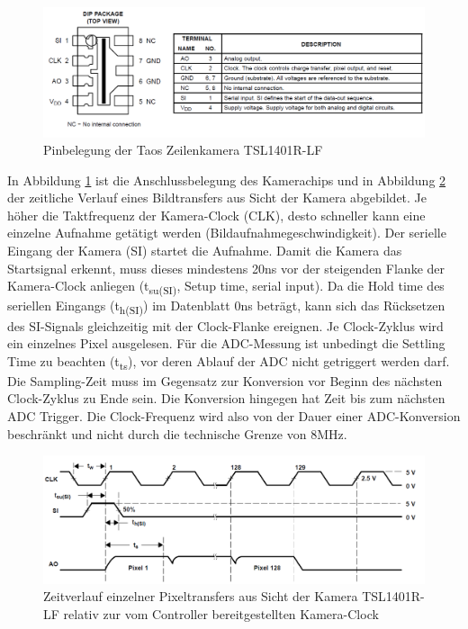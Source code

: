 \begin{figure}[H] %
\includegraphics[width=.90\textwidth]{sec7/images/CamPinning} 
\centering
\captionsetup{width=.95\textwidth}
\caption[Pinbelegung der Taos Zeilenkamera TSL1401R-LF ~\protect\cite{Taos}]{Pinbelegung der Taos Zeilenkamera TSL1401R-LF ~\protect\cite{Taos}}\centering
\label{fig:CamPinning}
\end{figure}

In Abbildung \ref{fig:CamPinning} ist die Anschlussbelegung des Kamerachips und in Abbildung \ref{fig:CamWaveform} der zeitliche Verlauf eines Bildtransfers aus Sicht der Kamera abgebildet. Je höher die Taktfrequenz der Kamera-Clock (CLK), desto schneller kann eine einzelne Aufnahme getätigt werden (Bildaufnahmegeschwindigkeit). Der serielle Eingang der Kamera (SI) startet die Aufnahme. Damit die Kamera das Startsignal erkennt, muss dieses mindestens 20ns vor der steigenden Flanke der Kamera-Clock anliegen (t\textsubscript{su(SI)}, \glqq{}Setup time, serial input\grqq{}). Da die \glqq{}Hold time\grqq{} des seriellen Eingangs (t\textsubscript{h(SI)}) im Datenblatt 0ns beträgt, kann sich das Rücksetzen des SI-Signals gleichzeitig mit der Clock-Flanke ereignen. Je Clock-Zyklus wird ein einzelnes Pixel ausgelesen. Für die ADC-Messung ist unbedingt die \glqq{}Settling Time\grqq{} zu beachten (t\textsubscript{ts}), vor deren Ablauf der ADC nicht getriggert werden darf. Die Sampling-Zeit muss im Gegensatz zur Konversion vor Beginn des nächsten Clock-Zyklus zu Ende sein. Die Konversion hingegen hat Zeit bis zum nächsten ADC Trigger. Die Clock-Frequenz wird also von der Dauer einer ADC-Konversion beschränkt und nicht durch die technische Grenze von 8MHz. 

\begin{figure}[H] %
\includegraphics[width=.95\textwidth]{sec7/images/CamWaveform} 
\centering
\captionsetup{width=.95\textwidth}
\caption[Zeitverlauf einzelner Pixeltransfers aus Sicht der Kamera ~\protect\cite{Taos}]{Zeitverlauf einzelner Pixeltransfers aus Sicht der Kamera TSL1401R-LF  relativ zur vom Controller bereitgestellten Kamera-Clock ~\protect\cite{Taos}}\centering
\label{fig:CamWaveform}
\end{figure}

